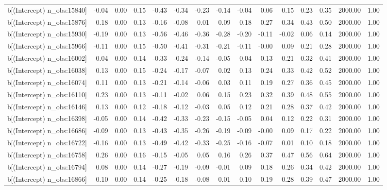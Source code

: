 \begin{table}[ht]
\begin{tabular}{rrrrrrrrrrrrrrr}
  b[(Intercept) n\_obs:15840] & -0.04 & 0.00 & 0.15 & -0.43 & -0.34 & -0.23 & -0.14 & -0.04 & 0.06 & 0.15 & 0.23 & 0.35 & 2000.00 & 1.00 \\ 
  b[(Intercept) n\_obs:15876] & 0.18 & 0.00 & 0.13 & -0.16 & -0.08 & 0.01 & 0.09 & 0.18 & 0.27 & 0.34 & 0.43 & 0.50 & 2000.00 & 1.00 \\ 
  b[(Intercept) n\_obs:15930] & -0.19 & 0.00 & 0.13 & -0.56 & -0.46 & -0.36 & -0.28 & -0.20 & -0.11 & -0.02 & 0.06 & 0.14 & 2000.00 & 1.00 \\ 
  b[(Intercept) n\_obs:15966] & -0.11 & 0.00 & 0.15 & -0.50 & -0.41 & -0.31 & -0.21 & -0.11 & -0.00 & 0.09 & 0.21 & 0.28 & 2000.00 & 1.00 \\ 
  b[(Intercept) n\_obs:16002] & 0.04 & 0.00 & 0.14 & -0.33 & -0.24 & -0.14 & -0.05 & 0.04 & 0.13 & 0.21 & 0.32 & 0.41 & 2000.00 & 1.00 \\ 
  b[(Intercept) n\_obs:16038] & 0.13 & 0.00 & 0.15 & -0.24 & -0.17 & -0.07 & 0.02 & 0.13 & 0.24 & 0.33 & 0.42 & 0.52 & 2000.00 & 1.00 \\ 
  b[(Intercept) n\_obs:16074] & 0.11 & 0.00 & 0.13 & -0.21 & -0.14 & -0.06 & 0.03 & 0.11 & 0.19 & 0.27 & 0.36 & 0.45 & 2000.00 & 1.00 \\ 
  b[(Intercept) n\_obs:16110] & 0.23 & 0.00 & 0.13 & -0.11 & -0.02 & 0.06 & 0.15 & 0.23 & 0.32 & 0.39 & 0.48 & 0.55 & 2000.00 & 1.00 \\ 
  b[(Intercept) n\_obs:16146] & 0.13 & 0.00 & 0.12 & -0.18 & -0.12 & -0.03 & 0.05 & 0.12 & 0.21 & 0.28 & 0.37 & 0.42 & 2000.00 & 1.00 \\ 
  b[(Intercept) n\_obs:16398] & -0.05 & 0.00 & 0.14 & -0.42 & -0.33 & -0.23 & -0.15 & -0.05 & 0.04 & 0.12 & 0.22 & 0.31 & 2000.00 & 1.00 \\ 
  b[(Intercept) n\_obs:16686] & -0.09 & 0.00 & 0.13 & -0.43 & -0.35 & -0.26 & -0.19 & -0.09 & -0.00 & 0.09 & 0.17 & 0.22 & 2000.00 & 1.00 \\ 
  b[(Intercept) n\_obs:16722] & -0.16 & 0.00 & 0.13 & -0.49 & -0.42 & -0.33 & -0.25 & -0.16 & -0.07 & 0.01 & 0.10 & 0.18 & 2000.00 & 1.00 \\ 
  b[(Intercept) n\_obs:16758] & 0.26 & 0.00 & 0.16 & -0.15 & -0.05 & 0.05 & 0.16 & 0.26 & 0.37 & 0.47 & 0.56 & 0.64 & 2000.00 & 1.00 \\ 
  b[(Intercept) n\_obs:16794] & 0.08 & 0.00 & 0.14 & -0.27 & -0.19 & -0.09 & -0.01 & 0.09 & 0.18 & 0.26 & 0.34 & 0.42 & 2000.00 & 1.00 \\ 
  b[(Intercept) n\_obs:16866] & 0.10 & 0.00 & 0.14 & -0.25 & -0.18 & -0.08 & 0.01 & 0.10 & 0.19 & 0.28 & 0.39 & 0.47 & 2000.00 & 1.00 \\ 

\end{tabular}
\end{table}
